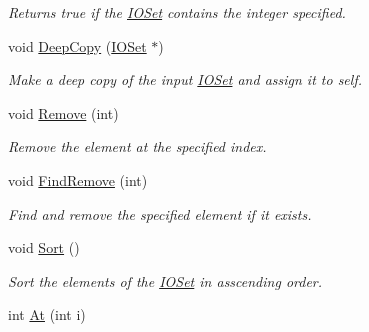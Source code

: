 \begin{DoxyCompactItemize}
\begin{DoxyCompactList}\small\item\em Returns true if the \hyperlink{class_i_o_set}{IOSet} contains the integer specified. \item\end{DoxyCompactList}\item 
\hypertarget{class_i_o_set_ae416909c86424400c72de7317346c733}{
void \hyperlink{class_i_o_set_ae416909c86424400c72de7317346c733}{DeepCopy} (\hyperlink{class_i_o_set}{IOSet} $\ast$)}
\label{class_i_o_set_ae416909c86424400c72de7317346c733}

\begin{DoxyCompactList}\small\item\em Make a deep copy of the input \hyperlink{class_i_o_set}{IOSet} and assign it to self. \item\end{DoxyCompactList}\item 
\hypertarget{class_i_o_set_a0021b9c44555444066dbb068f253a71c}{
void \hyperlink{class_i_o_set_a0021b9c44555444066dbb068f253a71c}{Remove} (int)}
\label{class_i_o_set_a0021b9c44555444066dbb068f253a71c}

\begin{DoxyCompactList}\small\item\em Remove the element at the specified index. \item\end{DoxyCompactList}\item 
\hypertarget{class_i_o_set_a7e135f27326a102ab45ec56b33f8c5c3}{
void \hyperlink{class_i_o_set_a7e135f27326a102ab45ec56b33f8c5c3}{FindRemove} (int)}
\label{class_i_o_set_a7e135f27326a102ab45ec56b33f8c5c3}

\begin{DoxyCompactList}\small\item\em Find and remove the specified element if it exists. \item\end{DoxyCompactList}\item 
\hypertarget{class_i_o_set_aa840da94162188f037e18152b7ddbc5d}{
void \hyperlink{class_i_o_set_aa840da94162188f037e18152b7ddbc5d}{Sort} ()}
\label{class_i_o_set_aa840da94162188f037e18152b7ddbc5d}

\begin{DoxyCompactList}\small\item\em Sort the elements of the \hyperlink{class_i_o_set}{IOSet} in asscending order. \item\end{DoxyCompactList}\item 
\hypertarget{class_i_o_set_a260b6fe08d622da8938b01f63221f230}{
int \hyperlink{class_i_o_set_a260b6fe08d622da8938b01f63221f230}{At} (int i)}
\label{class_i_o_set_a260b6fe08d622da8938b01f63221f230}


\end{DoxyCompactItemize}
